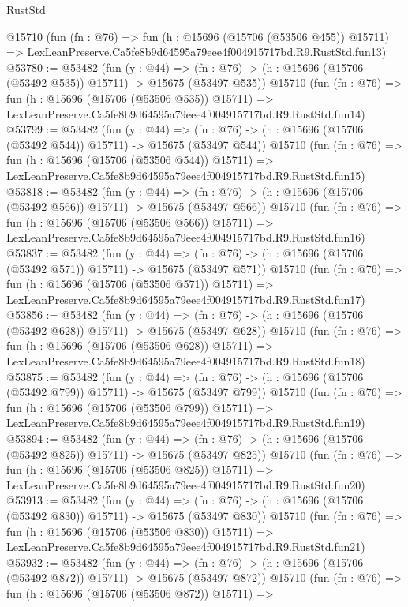 \begin{lexlean}{RustStd}
\begin{coremodule}
    @15710
    (fun (fn : @76) =>
    fun (h : @15696 (@15706 (@53506 @455)) @15711) =>
    LexLeanPreserve.Ca5fe8b9d64595a79eee4f004915717bd.R9.RustStd.fun13)
@53780 := @53482
    (fun (y : @44) =>
    (fn : @76) -> (h : @15696 (@15706 (@53492 @535)) @15711) -> @15675 (@53497 @535))
    @15710
    (fun (fn : @76) =>
    fun (h : @15696 (@15706 (@53506 @535)) @15711) =>
    LexLeanPreserve.Ca5fe8b9d64595a79eee4f004915717bd.R9.RustStd.fun14)
@53799 := @53482
    (fun (y : @44) =>
    (fn : @76) -> (h : @15696 (@15706 (@53492 @544)) @15711) -> @15675 (@53497 @544))
    @15710
    (fun (fn : @76) =>
    fun (h : @15696 (@15706 (@53506 @544)) @15711) =>
    LexLeanPreserve.Ca5fe8b9d64595a79eee4f004915717bd.R9.RustStd.fun15)
@53818 := @53482
    (fun (y : @44) =>
    (fn : @76) -> (h : @15696 (@15706 (@53492 @566)) @15711) -> @15675 (@53497 @566))
    @15710
    (fun (fn : @76) =>
    fun (h : @15696 (@15706 (@53506 @566)) @15711) =>
    LexLeanPreserve.Ca5fe8b9d64595a79eee4f004915717bd.R9.RustStd.fun16)
@53837 := @53482
    (fun (y : @44) =>
    (fn : @76) -> (h : @15696 (@15706 (@53492 @571)) @15711) -> @15675 (@53497 @571))
    @15710
    (fun (fn : @76) =>
    fun (h : @15696 (@15706 (@53506 @571)) @15711) =>
    LexLeanPreserve.Ca5fe8b9d64595a79eee4f004915717bd.R9.RustStd.fun17)
@53856 := @53482
    (fun (y : @44) =>
    (fn : @76) -> (h : @15696 (@15706 (@53492 @628)) @15711) -> @15675 (@53497 @628))
    @15710
    (fun (fn : @76) =>
    fun (h : @15696 (@15706 (@53506 @628)) @15711) =>
    LexLeanPreserve.Ca5fe8b9d64595a79eee4f004915717bd.R9.RustStd.fun18)
@53875 := @53482
    (fun (y : @44) =>
    (fn : @76) -> (h : @15696 (@15706 (@53492 @799)) @15711) -> @15675 (@53497 @799))
    @15710
    (fun (fn : @76) =>
    fun (h : @15696 (@15706 (@53506 @799)) @15711) =>
    LexLeanPreserve.Ca5fe8b9d64595a79eee4f004915717bd.R9.RustStd.fun19)
@53894 := @53482
    (fun (y : @44) =>
    (fn : @76) -> (h : @15696 (@15706 (@53492 @825)) @15711) -> @15675 (@53497 @825))
    @15710
    (fun (fn : @76) =>
    fun (h : @15696 (@15706 (@53506 @825)) @15711) =>
    LexLeanPreserve.Ca5fe8b9d64595a79eee4f004915717bd.R9.RustStd.fun20)
@53913 := @53482
    (fun (y : @44) =>
    (fn : @76) -> (h : @15696 (@15706 (@53492 @830)) @15711) -> @15675 (@53497 @830))
    @15710
    (fun (fn : @76) =>
    fun (h : @15696 (@15706 (@53506 @830)) @15711) =>
    LexLeanPreserve.Ca5fe8b9d64595a79eee4f004915717bd.R9.RustStd.fun21)
@53932 := @53482
    (fun (y : @44) =>
    (fn : @76) -> (h : @15696 (@15706 (@53492 @872)) @15711) -> @15675 (@53497 @872))
    @15710
    (fun (fn : @76) =>
    fun (h : @15696 (@15706 (@53506 @872)) @15711) =>

\end{coremodule}
\end{lexlean}
